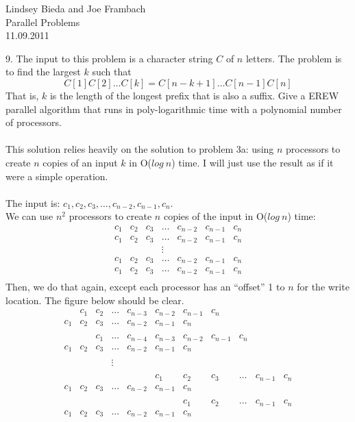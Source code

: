 \documentclass[10pt]{article}
\begin{document}
	\begin{flushright}
	Lindsey Bieda and Joe Frambach\\
	Parallel Problems\\
	11.09.2011
	\end{flushright}

9. The input to this problem is a character string $C$ of $n$ letters. The problem is to find the largest $k$
such that
\[C[1]C[2] \ldots C[k] = C[n - k + 1] \ldots C[n - 1]C[n]\]
That is, $k$ is the length of the longest prefix that is also a suffix. Give a EREW parallel algorithm that
runs in poly-logarithmic time with a polynomial number of processors.\\
\\
This solution relies heavily on the solution to problem 3a: using $n$ processors to create $n$ copies of 
an input $k$ in O($log~n$) time. I will just use the result as if it were a simple operation.\\
\\
The input is: $c_1, c_2, c_3, \ldots, c_{n-2}, c_{n-1}, c_n$.\\
We can use $n^2$ processors to create $n$ copies of the input in O($log~n$) time:\\
\[
\begin{array}{ccccccc}
c_1 & c_2 & c_3 & \ldots & c_{n-2} & c_{n-1} & c_n \\
c_1 & c_2 & c_3 & \ldots & c_{n-2} & c_{n-1} & c_n \\
    &     &     & \vdots &         &         &     \\
c_1 & c_2 & c_3 & \ldots & c_{n-2} & c_{n-1} & c_n \\
c_1 & c_2 & c_3 & \ldots & c_{n-2} & c_{n-1} & c_n \\
\end{array}
\]
Then, we do that again, except each processor has an ``offset'' 1 to $n$ for the write location.
The figure below should be clear.\\
\[
\begin{array}{ccccccccccccc}
    & c_1 & c_2 & \ldots & c_{n-3} & c_{n-2} & c_{n-1} & c_n \\
c_1 & c_2 & c_3 & \ldots & c_{n-2} & c_{n-1} & c_n \\
\\
    &     & c_1 & \ldots & c_{n-4} & c_{n-3} & c_{n-2} & c_{n-1} & c_n \\
c_1 & c_2 & c_3 & \ldots & c_{n-2} & c_{n-1} & c_n \\
\\
    &     &     & \vdots &         &         &     \\
\\
    &     &     &        &         & c_1     & c_2 & c_3 & \ldots & c_{n-1} & c_n \\
c_1 & c_2 & c_3 & \ldots & c_{n-2} & c_{n-1} & c_n \\
\\
    &     &     &        &         &         & c_1 & c_2 & \ldots & c_{n-1} & c_n \\
c_1 & c_2 & c_3 & \ldots & c_{n-2} & c_{n-1} & c_n \\
\end{array}
\]
\end{document}
